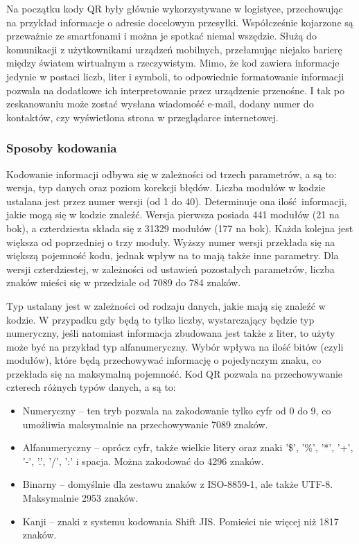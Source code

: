 Na początku kody QR były głównie wykorzystywane w logistyce, przechowując na przykład informacje o adresie docelowym przesyłki. Współcześnie kojarzone są przeważnie ze smartfonami i można je spotkać niemal wszędzie. Służą do komunikacji z użytkownikami urządzeń mobilnych, przełamując niejako barierę między światem wirtualnym a rzeczywistym. Mimo, że kod zawiera informacje jedynie w postaci liczb, liter i symboli, to odpowiednie formatowanie informacji pozwala na dodatkowe ich interpretowanie przez urządzenie przenośne. I tak po zeskanowaniu może zostać wysłana wiadomość e-mail, dodany numer do kontaktów, czy wyświetlona strona w przeglądarce internetowej.

\subsubsection*{Sposoby kodowania}

Kodowanie informacji odbywa się w zależności od trzech parametrów, a są to: wersja, typ danych oraz poziom korekcji błędów. Liczba modułów w kodzie ustalana jest przez numer wersji (od 1 do 40). Determinuje ona ilość informacji, jakie mogą się w kodzie znaleźć. Wersja pierwsza posiada 441 modułów (21 na bok), a czterdziesta składa się z 31329 modułów (177 na bok). Każda kolejna jest większa od poprzedniej o trzy moduły. Wyższy numer wersji przekłada się na większą pojemność kodu, jednak wpływ na to mają także inne parametry. Dla wersji czterdziestej, w zależności od ustawień pozostałych parametrów, liczba znaków mieści się w przedziale od 7089 do 784 znaków.

Typ ustalany jest w zależności od rodzaju danych, jakie mają się znaleźć w kodzie. W przypadku gdy będą to tylko liczby, wystarczający będzie typ numeryczny, jeśli natomiast informacja zbudowana jest także z liter, to użyty może być na przykład typ alfanumeryczny. Wybór wpływa na ilość bitów (czyli modułów), które będą przechowywać informację o pojedynczym znaku, co przekłada się na maksymalną pojemność. Kod QR pozwala na przechowywanie czterech różnych typów danych, a są to:

\begin{itemize}
	\item Numeryczny -- ten tryb pozwala na zakodowanie tylko cyfr od 0 do 9, co umożliwia maksymalnie na przechowywanie 7089 znaków.
	\item Alfanumeryczny -- oprócz cyfr, także wielkie litery oraz znaki '\$', '\%', '*', '+', '-', '.', '/', ':' i spacja. Można zakodować do 4296 znaków. 
	\item Binarny -- domyślnie dla zestawu znaków z ISO-8859-1, ale także UTF-8. Maksymalnie 2953 znaków.
	\item Kanji -- znaki z systemu kodowania Shift JIS. Pomieści nie więcej niż 1817 znaków.
\end{itemize}

